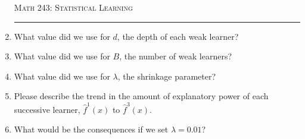 \documentclass{article}\usepackage[]{graphicx}\usepackage[]{color}
\begin{document}
\begin{enumerate}
\newpage

\begin{center}
\textsc{Math 243: Statistical Learning} \\
\noindent\rule{12cm}{0.4pt}
\end{center}

\item What value did we use for $d$, the depth of each weak learner?
\vspace{8mm}

\item What value did we use for $B$, the number of weak learners?
\vspace{8mm}

\item What value did we use for $\lambda$, the shrinkage parameter?
\vspace{8mm}

\item Please describe the trend in the amount of explanatory power of each successive learner, $\hat{f}^1(x)$ to $\hat{f}^3(x)$.
\vspace{25mm}

\item What would be the consequences if we set $\lambda = 0.01$?
\vspace{8mm}

\end{enumerate}
\end{document}
